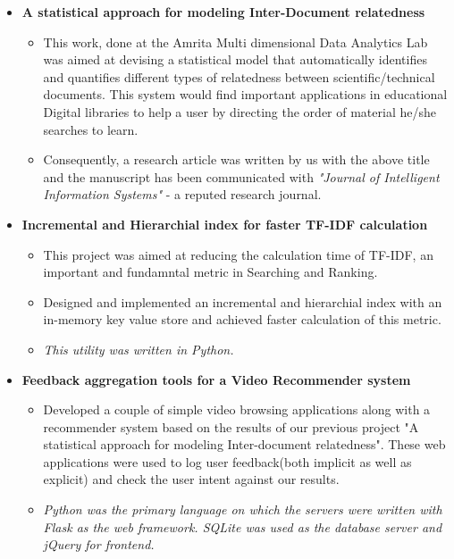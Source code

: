 \documentclass[letterpaper,11pt]{article}
\newcommand{\resitem}[1]{\item #1 \vspace{-2pt}}
\newcommand{\resheading}[1]{\textbf{\sffamily{\mbox{~}{\large #1} \vphantom{p\^{E}}}}}
\begin{document}
\resheading{Projects}
\begin{itemize}
\item[]
	\textbf{A statistical approach for modeling Inter-Document relatedness}
	\vspace{-3mm}
	\begin{itemize}
		\resitem{This work, done at the Amrita Multi dimensional Data Analytics Lab was aimed at devising a statistical model that automatically identifies and quantifies different types of relatedness between scientific/technical documents. This system would find important applications in educational Digital libraries to help a user by directing the order of material he/she searches to learn.}
		\resitem{Consequently, a research article was written by us with the above title and the manuscript has been communicated with \textit{"Journal of Intelligent Information Systems"} - a reputed research journal.}
	\end{itemize}

\item[]
	\textbf{Incremental and Hierarchial index for faster TF-IDF calculation}
	\vspace{-3mm}
	\begin{itemize}
	    \resitem{This project was aimed at reducing the calculation time of TF-IDF, an important and fundamntal metric in Searching and Ranking.}
		\resitem{Designed and implemented an incremental and hierarchial index with an in-memory key value store and achieved faster calculation of this metric.}
		\resitem{\textit{This utility was written in Python.}}
	\end{itemize}

\item[]
	\textbf{Feedback aggregation tools for a Video Recommender system}
	\vspace{-3mm}
	\begin{itemize}
		\resitem{Developed a couple of simple video browsing applications along with a recommender system based on the results of our previous project "A statistical approach for modeling Inter-document relatedness". These web applications were used to log user feedback(both implicit as well as explicit) and check the user intent against our results.}
		\resitem{\textit{Python was the primary language on which the servers were written with Flask as the web framework. SQLite was used as the database server and jQuery for frontend.}}
	\end{itemize}

\end{itemize}
\end{document}
